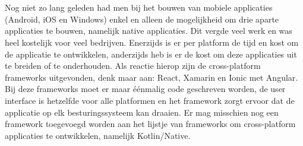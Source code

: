 %
%

%



\chapter*{}

Nog niet zo lang geleden had men bij het bouwen van mobiele applicaties (Android, iOS en Windows) enkel en alleen de mogelijkheid om drie aparte applicaties te bouwen, namelijk native applicaties. Dit vergde veel werk en was heel kostelijk voor veel bedrijven. Enerzijds is er per platform de tijd en kost om de applicatie te ontwikkelen, anderzijds heb is er de kost om deze applicaties uit te breiden of te onderhouden. Als reactie hierop zijn de cross-platform frameworks uitgevonden, denk maar aan: React, Xamarin en Ionic met Angular. Bij deze frameworks moet er maar éénmalig code geschreven worden, de user interface is hetzelfde voor alle platformen en het framework zorgt ervoor dat de applicatie op elk besturingssysteem kan draaien. Er mag misschien nog een framework toegevoegd worden aan het lijstje van frameworks om cross-platform applicaties te ontwikkelen, namelijk Kotlin/Native.

